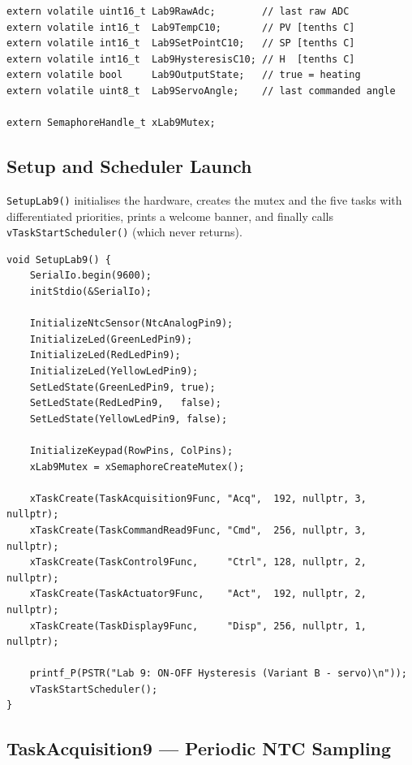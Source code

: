 \documentclass[12pt]{article}
\begin{document}
\begin{lstlisting}[caption={Lab9Sync.h --- shared volatile data and mutex}]
extern volatile uint16_t Lab9RawAdc;        // last raw ADC
extern volatile int16_t  Lab9TempC10;       // PV [tenths C]
extern volatile int16_t  Lab9SetPointC10;   // SP [tenths C]
extern volatile int16_t  Lab9HysteresisC10; // H  [tenths C]
extern volatile bool     Lab9OutputState;   // true = heating
extern volatile uint8_t  Lab9ServoAngle;    // last commanded angle

extern SemaphoreHandle_t xLab9Mutex;
\end{lstlisting}

\subsection{Setup and Scheduler Launch}

\texttt{SetupLab9()} initialises the hardware, creates the mutex and the five tasks with differentiated priorities, prints a welcome banner, and finally calls \texttt{vTaskStartScheduler()} (which never returns).

\begin{lstlisting}[caption={SetupLab9 --- task creation and scheduler launch}]
void SetupLab9() {
    SerialIo.begin(9600);
    initStdio(&SerialIo);

    InitializeNtcSensor(NtcAnalogPin9);
    InitializeLed(GreenLedPin9);
    InitializeLed(RedLedPin9);
    InitializeLed(YellowLedPin9);
    SetLedState(GreenLedPin9, true);
    SetLedState(RedLedPin9,   false);
    SetLedState(YellowLedPin9, false);

    InitializeKeypad(RowPins, ColPins);
    xLab9Mutex = xSemaphoreCreateMutex();

    xTaskCreate(TaskAcquisition9Func, "Acq",  192, nullptr, 3, nullptr);
    xTaskCreate(TaskCommandRead9Func, "Cmd",  256, nullptr, 3, nullptr);
    xTaskCreate(TaskControl9Func,     "Ctrl", 128, nullptr, 2, nullptr);
    xTaskCreate(TaskActuator9Func,    "Act",  192, nullptr, 2, nullptr);
    xTaskCreate(TaskDisplay9Func,     "Disp", 256, nullptr, 1, nullptr);

    printf_P(PSTR("Lab 9: ON-OFF Hysteresis (Variant B - servo)\n"));
    vTaskStartScheduler();
}
\end{lstlisting}

\subsection{TaskAcquisition9 --- Periodic NTC Sampling}
\end{document}

